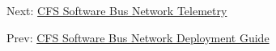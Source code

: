 Next\-: \hyperlink{cfssbntlm}{C\-F\-S Software Bus Network Telemetry} \par
 Prev\-: \hyperlink{cfssbndg}{C\-F\-S Software Bus Network Deployment Guide} 